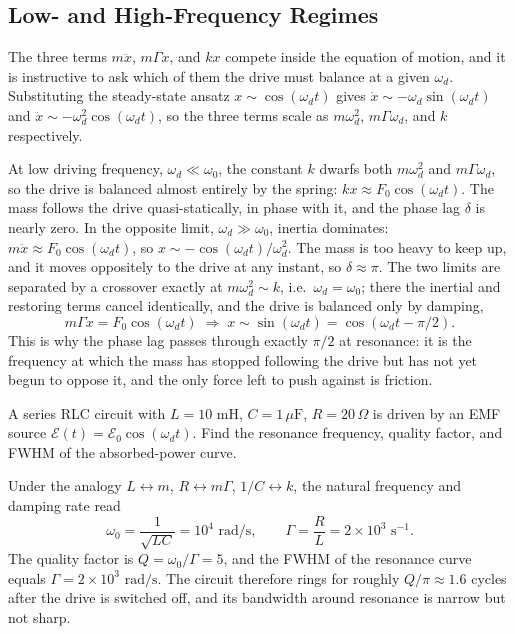 \subsection{Low- and High-Frequency Regimes}

The three terms $m\ddot{x}$, $m\Gamma\dot{x}$, and $kx$ compete inside the equation of motion, and it is instructive to ask which of them the drive must balance at a given $\omega_d$. Substituting the steady-state ansatz $x \sim \cos(\omega_d t)$ gives $\dot{x} \sim -\omega_d\sin(\omega_d t)$ and $\ddot{x} \sim -\omega_d^2\cos(\omega_d t)$, so the three terms scale as $m\omega_d^2$, $m\Gamma\omega_d$, and $k$ respectively.

At low driving frequency, $\omega_d \ll \omega_0$, the constant $k$ dwarfs both $m\omega_d^2$ and $m\Gamma\omega_d$, so the drive is balanced almost entirely by the spring: $kx \approx F_0\cos(\omega_d t)$. The mass follows the drive quasi-statically, in phase with it, and the phase lag $\delta$ is nearly zero. In the opposite limit, $\omega_d \gg \omega_0$, inertia dominates: $m\ddot{x} \approx F_0\cos(\omega_d t)$, so $x \sim -\cos(\omega_d t)/\omega_d^2$. The mass is too heavy to keep up, and it moves oppositely to the drive at any instant, so $\delta \approx \pi$. The two limits are separated by a crossover exactly at $m\omega_d^2 \sim k$, i.e.\ $\omega_d = \omega_0$; there the inertial and restoring terms cancel identically, and the drive is balanced only by damping,
\begin{equation}
    m\Gamma\dot{x} = F_0\cos(\omega_d t) \;\Longrightarrow\; x \sim \sin(\omega_d t) = \cos(\omega_d t - \pi/2).
\end{equation}
This is why the phase lag passes through exactly $\pi/2$ at resonance: it is the frequency at which the mass has stopped following the drive but has not yet begun to oppose it, and the only force left to push against is friction.

\begin{example}
A series RLC circuit with $L=10\text{ mH}$, $C=1\,\mu\text{F}$, $R=20\,\Omega$ is driven by an EMF source $\mathcal{E}(t) = \mathcal{E}_0\cos(\omega_d t)$. Find the resonance frequency, quality factor, and FWHM of the absorbed-power curve.

Under the analogy $L\leftrightarrow m$, $R\leftrightarrow m\Gamma$, $1/C\leftrightarrow k$, the natural frequency and damping rate read
\begin{equation}
    \omega_0 = \frac{1}{\sqrt{LC}} = 10^4\text{ rad/s},\qquad \Gamma = \frac{R}{L} = 2\times 10^3\text{ s}^{-1}.
\end{equation}
The quality factor is $Q = \omega_0/\Gamma = 5$, and the FWHM of the resonance curve equals $\Gamma = 2\times 10^3\text{ rad/s}$. The circuit therefore rings for roughly $Q/\pi\approx 1.6$ cycles after the drive is switched off, and its bandwidth around resonance is narrow but not sharp.
\end{example}

